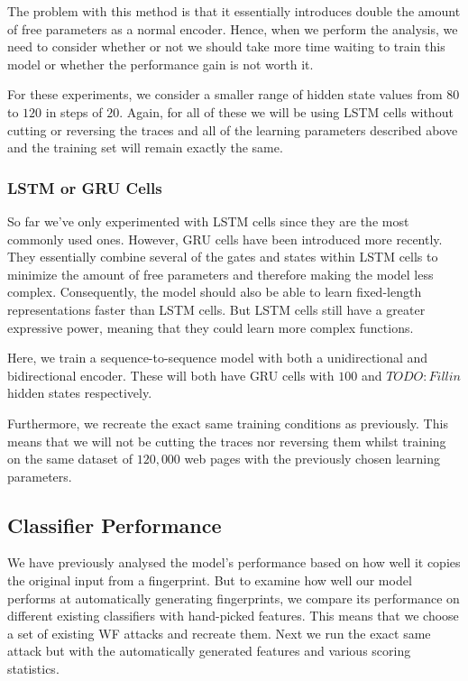 The problem with this method is that it essentially introduces double the amount of free parameters as a normal encoder.
Hence, when we perform the analysis, we need to consider whether or not we should take more time waiting to train this model or whether the performance gain is not worth it.

For these experiments, we consider a smaller range of hidden state values from $80$ to $120$ in steps of $20$.
Again, for all of these we will be using LSTM cells without cutting or reversing the traces and all of the learning parameters described above and the training set will remain exactly the same.


\subsubsection{LSTM or GRU Cells}

So far we've only experimented with LSTM cells since they are the most commonly used ones.
However, GRU cells have been introduced more recently.
They essentially combine several of the gates and states within LSTM cells to minimize the amount of free parameters and therefore making the model less complex.
Consequently, the model should also be able to learn fixed-length representations faster than LSTM cells.
But LSTM cells still have a greater expressive power, meaning that they could learn more complex functions.

Here, we train a sequence-to-sequence model with both a unidirectional and bidirectional encoder.
These will both have GRU cells with $100$ and $TODO: Fill in$ hidden states respectively.

Furthermore, we recreate the exact same training conditions as previously.
This means that we will not be cutting the traces nor reversing them whilst training on the same dataset of $120,000$ web pages with the previously chosen learning parameters.


\subsection{Classifier Performance}

We have previously analysed the model's performance based on how well it copies the original input from a fingerprint.
But to examine how well our model performs at automatically generating fingerprints, we compare its performance on different existing classifiers with hand-picked features.
This means that we choose a set of existing WF attacks and recreate them.
Next we run the exact same attack but with the automatically generated features and various scoring statistics.


